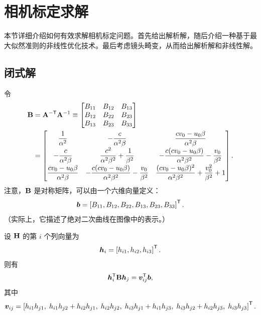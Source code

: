 \section{相机标定求解}\label{sec:calibration-solution}

本节详细介绍如何有效求解相机标定问题。首先给出解析解，随后介绍一种基于最大似然准则的非线性优化技术。最后考虑镜头畸变，从而给出解析解和非线性解。

\subsection{闭式解}\label{subsec:closed-form}

令
\begin{equation}
\begin{aligned}
\mathbf{B} &= \mathbf{A}^{-\mathsf{T}}\mathbf{A}^{-1}
\equiv
\begin{bmatrix}
B_{11} & B_{12} & B_{13}\\
B_{12} & B_{22} & B_{23}\\
B_{13} & B_{23} & B_{33}
\end{bmatrix}\\
&=
\begin{bmatrix}
\dfrac{1}{\alpha^2}
&-\dfrac{c}{\alpha^2\beta}
&\dfrac{cv_0-u_0\beta}{\alpha^2\beta}\\[0.6em]
-\dfrac{c}{\alpha^2\beta}
&\dfrac{c^2}{\alpha^2\beta^2}+\dfrac{1}{\beta^2}
&-\dfrac{c(cv_0-u_0\beta)}{\alpha^2\beta^2}-\dfrac{v_0}{\beta^2}\\[0.6em]
\dfrac{cv_0-u_0\beta}{\alpha^2\beta}
&-\dfrac{c(cv_0-u_0\beta)}{\alpha^2\beta^2}-\dfrac{v_0}{\beta^2}
&\dfrac{(cv_0-u_0\beta)^2}{\alpha^2\beta^2}+\dfrac{v_0^2}{\beta^2}+1
\end{bmatrix} .
\end{aligned}
\label{eq:intrinsic-constraint-matrix}
\end{equation}
注意，$\mathbf{B}$ 是对称矩阵，可以由一个六维向量定义：
\begin{equation}
\boldsymbol{b}=\left[B_{11},B_{12},B_{22},B_{13},B_{23},B_{33}\right]^{\mathsf{T}} .
\label{eq:intrinsic-constraint-vector}
\end{equation}
（实际上，它描述了绝对二次曲线在图像中的表示。）

设 $\mathbf{H}$ 的第 $i$ 个列向量为
\begin{equation*}
\boldsymbol{h}_i=\left[h_{i1},h_{i2},h_{i3}\right]^{\mathsf{T}} .
\end{equation*}
则有
\begin{equation}
\boldsymbol{h}_i^{\mathsf{T}}\mathbf{B}\boldsymbol{h}_j=\boldsymbol{v}_{ij}^{\mathsf{T}}\boldsymbol{b},
\label{eq:homography-constraint-vector}
\end{equation}
其中
\begin{equation*}
\boldsymbol{v}_{ij}=\left[
h_{i1}h_{j1},\;
h_{i1}h_{j2}+h_{i2}h_{j1},\;
h_{i2}h_{j2},\;
h_{i3}h_{j1}+h_{i1}h_{j3},\;
h_{i3}h_{j2}+h_{i2}h_{j3},\;
h_{i3}h_{j3}
\right]^{\mathsf{T}} .
\end{equation*}

